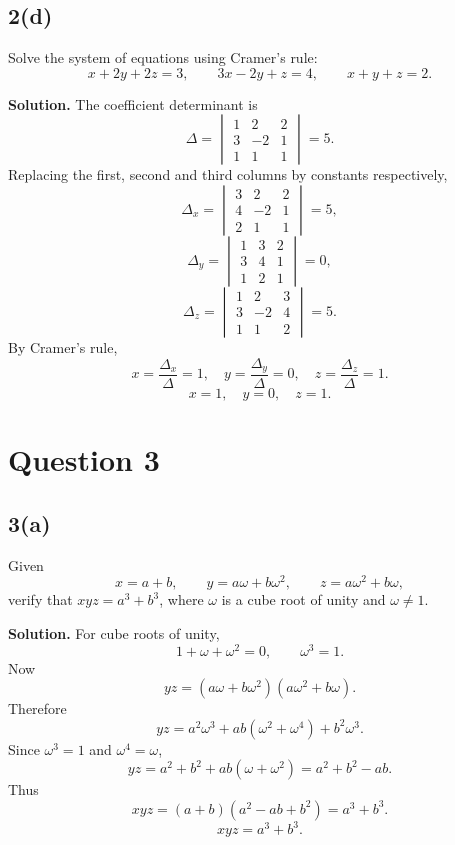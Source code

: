 \documentclass[11pt,a4paper]{article}
\newcommand{\ans}{\textbf{Solution.} }
\newcommand{\final}[1]{\[\boxed{#1}\]}
\begin{document}
\subsection*{2(d)}
\begin{questionbox}
Solve the system of equations using Cramer's rule:
\[
x+2y+2z=3,\qquad 3x-2y+z=4,
\qquad x+y+z=2.
\]
\end{questionbox}
\ans
The coefficient determinant is
\[
\Delta=\begin{vmatrix}1&2&2\\3&-2&1\\1&1&1\end{vmatrix}=5.
\]
Replacing the first, second and third columns by constants respectively,
\[
\Delta_x=\begin{vmatrix}3&2&2\\4&-2&1\\2&1&1\end{vmatrix}=5,
\]
\[
\Delta_y=\begin{vmatrix}1&3&2\\3&4&1\\1&2&1\end{vmatrix}=0,
\]
\[
\Delta_z=\begin{vmatrix}1&2&3\\3&-2&4\\1&1&2\end{vmatrix}=5.
\]
By Cramer's rule,
\[
x=\frac{\Delta_x}{\Delta}=1,
\quad
 y=\frac{\Delta_y}{\Delta}=0,
\quad
 z=\frac{\Delta_z}{\Delta}=1.
\]
\final{x=1,\quad y=0,\quad z=1.}

\section*{Question 3}

\subsection*{3(a)}
\begin{questionbox}
Given
\[
x=a+b,
\qquad y=a\omega+b\omega^2,
\qquad z=a\omega^2+b\omega,
\]
verify that $xyz=a^3+b^3$, where $\omega$ is a cube root of unity and $\omega\ne1$.
\end{questionbox}
\ans
For cube roots of unity,
\[
1+\omega+\omega^2=0,
\qquad \omega^3=1.
\]
Now
\[
yz=(a\omega+b\omega^2)(a\omega^2+b\omega).
\]
Therefore
\[
yz=a^2\omega^3+ab(\omega^2+\omega^4)+b^2\omega^3.
\]
Since $\omega^3=1$ and $\omega^4=\omega$,
\[
yz=a^2+b^2+ab(\omega+\omega^2)=a^2+b^2-ab.
\]
Thus
\[
xyz=(a+b)(a^2-ab+b^2)=a^3+b^3.
\]
\final{xyz=a^3+b^3.}
\end{document}

